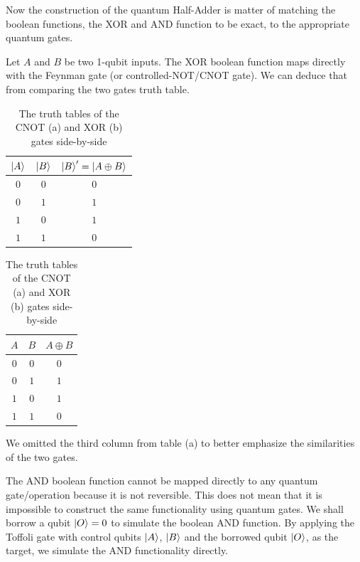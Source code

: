 Now the construction of the quantum Half-Adder is matter of matching the boolean functions, the XOR and AND function to be exact, to the
appropriate quantum gates.

Let $A$ and $B$ be two 1-qubit inputs. The XOR boolean function maps directly with the Feynman gate (or controlled-NOT/CNOT gate). We can deduce that
from comparing the two gates truth table.

\begin{table}[!ht]
    \centering
    \begin{subtable}[h]{0.45\textwidth}
        \centering
        \begin{tabular}{cc|c}
            $\ket{A}$ & $\ket{B}$ & $\ket{B}'=\ket{A \oplus B}$ \\
            \hline
            $0$ & $0$ & $0$ \\
            $0$ & $1$ & $1$ \\
            $1$ & $0$ & $1$ \\
            $1$ & $1$ & $0$ \\
        \end{tabular}
        \caption{CNOT's truth table}
    \end{subtable}
    \begin{subtable}[!h]{0.45\textwidth}
        \centering
        \begin{tabular}{cc|c}
            $A$ & $B$ & $A \oplus B$ \\
            \hline
            $0$ & $0$ & $0$ \\
            $0$ & $1$ & $1$ \\
            $1$ & $0$ & $1$ \\
            $1$ & $1$ & $0$ \\
        \end{tabular}
        \caption{XOR's truth table}
    \end{subtable}
    \caption{The truth tables of the CNOT (a) and XOR (b) gates side-by-side}
\end{table}

We omitted the third column from table (a) to better emphasize the similarities of the two gates.

The AND boolean function cannot be mapped directly to any quantum gate/operation because it is not reversible. This does not mean that it is
impossible to construct the same functionality using quantum gates. We shall borrow a  qubit $\ket{O} = 0$ to simulate the boolean AND function.
By applying the Toffoli gate with control qubits $\ket{A}$, $\ket{B}$ and the borrowed qubit $\ket{O}$, as the target, we simulate the AND functionality
directly.

